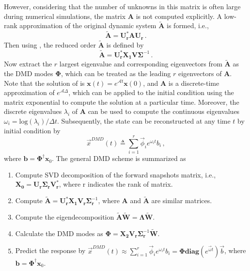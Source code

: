 However, considering that the number of unknowns in this matrix is often large during numerical simulations, the matrix $\mathbf{A}$ is not computed explicitly.
A low-rank approximation of the original dynamic system $\mathbf{\tilde{A}}$ is formed, i.e.,
\begin{equation}
\label{eq:reduced_dmd_1}
\mathbf{\tilde{A}} =  \mathbf{U_r^* A U_r} \, .
\end{equation}
Then using , the reduced order $\mathbf{\tilde{A}}$ is defined by
\begin{equation}
\label{eq:reduced_dmd_2}
\mathbf{\tilde{A}} =  \mathbf{U_r^*} \mathbf{X_1} \mathbf{V} \bm{\Sigma}^{-1} \, .
\end{equation}
Now extract the $r$ largest eigenvalue and corresponding eigenvectors from $\mathbf{\tilde{A}}$ as the DMD modes $\boldsymbol{\Phi}$, which can be treated as the leading $r$ eigenvectors of $\mathbf{A}$.
Note that the solution of  is $\mathbf{x}(t) = e^{\mathcal{A}t}\mathbf{x}(0)$, and $\mathbf{A}$ is a discrete-time approximation of $e^{\mathcal{A}\Delta}$, which can be applied to the initial condition using the matrix exponential to compute the solution at a particular time. 
Moreover, the discrete eigenvalues $\lambda_i$ of $\mathbf{A}$ can be used to compute the continuous eigenvalues $\omega_i= \text{log}(\lambda_i)/\Delta t$. Subsequently, the state can be reconstructed at any time $t$ by initial condition by  
\begin{equation}
\label{eq:dmd_predict}
\vec{x}^{DMD}(t) \triangleq \sum_{i=1}^{r} \vec{\phi}_i e^{\omega_it} b_i \, ,
\end{equation}
where $\mathbf{b}=\boldsymbol{\Phi}^{\dag} \mathbf{x}_{0}$. 
The general DMD scheme is summarized as

\begin{enumerate}
\item Compute SVD decomposition of the forward snapshots matrix, i.e., $ \mathbf{X_0} = \mathbf{U_r} \boldsymbol{\Sigma_r} \mathbf{V_r^{*}}$, where r indicates the rank of matrix.
\item Compute $\mathbf{\tilde{A}}=\mathbf{U_r^{*}X_1}\mathbf{V_r}\boldsymbol{\Sigma}_{\mathbf{r}}^{-1}$, where $\mathbf{A}$ and $\mathbf{\tilde{A}}$ are similar matrices.
\item Compute the eigendecomposition $\mathbf{\tilde{A} \tilde{W}}=\boldsymbol{\Lambda}\mathbf{\tilde{W}}$.
\item Calculate the DMD modes as ${\boldsymbol{\Phi}}={\mathbf{X_2V_r}}\boldsymbol{\Sigma}_\mathbf{r}^{-1}{\mathbf{\tilde{W}}}$.
\item Predict the response by $\vec{x}^{DMD}(t) \approx \sum_{i=1}^{r} \vec{\phi}_i e^{\omega_it} b_i = \boldsymbol{\Phi}{\mathbf{diag}}(e^{\vec{\omega}t})\vec{b}$, where $\mathbf{b}=\boldsymbol{\Phi}^{\dag} \mathbf{x}_{0}$.
\end{enumerate}



